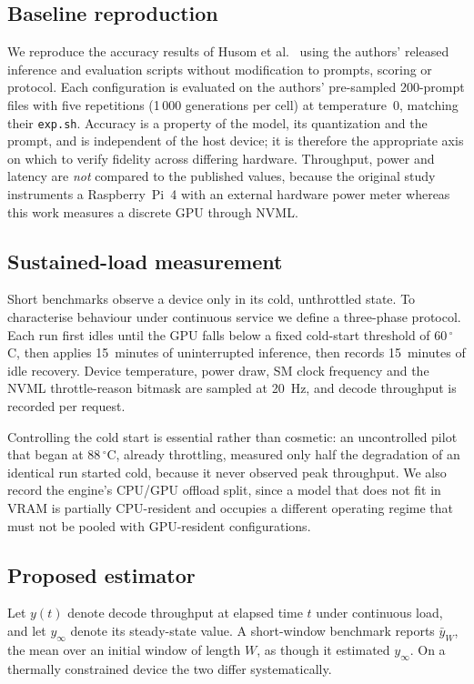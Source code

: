\documentclass[11pt,a4paper]{article}
\begin{document}
\subsection{Baseline reproduction}
We reproduce the accuracy results of Husom et al.~\cite{husom2025sustainable}
using the authors' released inference and evaluation scripts without
modification to prompts, scoring or protocol. Each configuration is evaluated on
the authors' pre-sampled 200-prompt files with five repetitions
(\mbox{1\,000} generations per cell) at temperature~0, matching their
\texttt{exp.sh}. Accuracy is a property of the model, its quantization and the
prompt, and is independent of the host device; it is therefore the appropriate
axis on which to verify fidelity across differing hardware. Throughput, power
and latency are \emph{not} compared to the published values, because the
original study instruments a Raspberry~Pi~4 with an external hardware power
meter whereas this work measures a discrete GPU through NVML.

\subsection{Sustained-load measurement}
Short benchmarks observe a device only in its cold, unthrottled state. To
characterise behaviour under continuous service we define a three-phase
protocol. Each run first idles until the GPU falls below a fixed cold-start
threshold of $60\,^\circ$C, then applies 15~minutes of uninterrupted inference,
then records 15~minutes of idle recovery. Device temperature, power draw, SM
clock frequency and the NVML throttle-reason bitmask are sampled at 20~Hz, and
decode throughput is recorded per request.

Controlling the cold start is essential rather than cosmetic: an uncontrolled
pilot that began at $88\,^\circ$C, already throttling, measured only half the
degradation of an identical run started cold, because it never observed peak
throughput. We also record the engine's CPU/GPU offload split, since a model
that does not fit in VRAM is partially CPU-resident and occupies a different
operating regime that must not be pooled with GPU-resident configurations.

\subsection{Proposed estimator}
Let $y(t)$ denote decode throughput at elapsed time $t$ under continuous load,
and let $y_\infty$ denote its steady-state value. A short-window benchmark
reports $\bar{y}_W$, the mean over an initial window of length $W$, as though it
estimated $y_\infty$. On a thermally constrained device the two differ
systematically.
\end{document}
